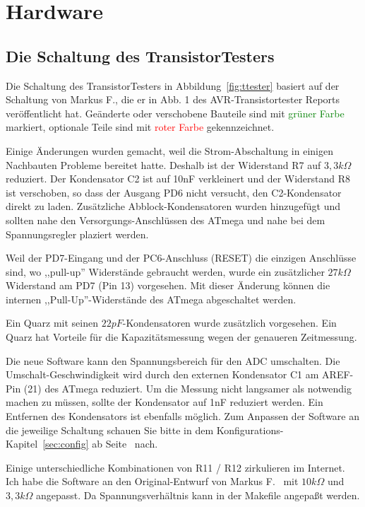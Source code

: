 \chapter{Hardware}

\section{Die Schaltung des TransistorTesters}
\label{sec:hardware}
Die Schaltung des TransistorTesters in Abbildung~\ref{fig:ttester} basiert auf der Schaltung von
Markus F., die er in Abb. 1 des AVR-Transistortester Reports \cite{Frejek} veröffentlicht hat.
Geänderte oder verschobene Bauteile sind mit \textcolor{green}{grüner Farbe} markiert, optionale Teile sind
mit \textcolor{red}{roter Farbe} gekennzeichnet.

Einige Änderungen wurden gemacht, weil die Strom-Abschaltung in einigen Nachbauten Probleme
bereitet hatte.
Deshalb ist der Widerstand R7 auf \(3,3k\Omega\) reduziert. 
Der Kondensator C2 ist auf 10nF verkleinert und der Widerstand R8 ist verschoben, so dass der
Ausgang PD6 nicht versucht, den C2-Kondensator direkt zu laden.
Zusätzliche Abblock-Kondensatoren wurden hinzugefügt und sollten nahe den Versorgungs-Anschlüssen
des ATmega und nahe bei dem Spannungsregler plaziert werden.

Weil der PD7-Eingang und der PC6-Anschluss (RESET) die einzigen Anschlüsse sind, wo
,,pull-up'' Widerstände gebraucht werden, wurde ein zusätzlicher \(27k\Omega\) Widerstand am PD7 (Pin 13) vorgesehen.
Mit dieser Änderung können die internen ,,Pull-Up''-Widerstände des ATmega abgeschaltet werden.

Ein Quarz mit seinen \(22pF\)-Kondensatoren wurde zusätzlich vorgesehen.
Ein Quarz hat Vorteile für die Kapazitätsmessung wegen der genaueren Zeitmessung.

Die neue Software kann den Spannungsbereich für den ADC umschalten. Die Um\-schalt-Ge\-schwin\-dig\-keit
wird durch den externen Kondensator C1 am AREF-Pin (21) des ATmega reduziert.
Um die Messung nicht langsamer als notwendig machen zu müssen, sollte der Kondensator auf
1nF reduziert werden. Ein Entfernen des Kondensators ist ebenfalls möglich.
Zum Anpassen der Software an die jeweilige Schaltung schauen Sie bitte in dem
Kon\-fi\-gura\-tions-Kapitel~\ref{sec:config} ab Seite~\pageref{sec:config} nach. 

Einige unterschiedliche Kombinationen von R11 / R12 zirkulieren im Internet.
Ich habe die Software an den Original-Entwurf von Markus F.~\cite{Frejek} mit \(10k\Omega\) und \(3,3k\Omega\) angepasst.
Da Spannungsverhältnis kann in der Makefile angepaßt werden.

